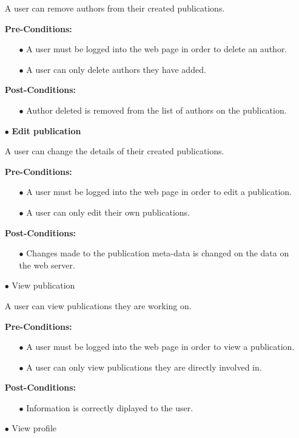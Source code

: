 \documentclass[a4paper,12pt]{article}
\begin{document}
\begin{itemize}
	 A user can remove authors from their created publications.

	\textbf{Pre-Conditions:}
	\begin{itemize}
		\item[$\bullet$]A user must be logged into the web page in order to delete an author.
		\item[$\bullet$]A user can only delete authors they have added.
		\\
	\end{itemize}
	\textbf{Post-Conditions: }
	\begin{itemize}
		\item[$\bullet$]Author deleted is removed from the list of authors on the publication.
		\\
	\end{itemize}
	\item[$\bullet$]\textbf{Edit publication}

	A user can change the details of their created publications.

	\textbf{Pre-Conditions:}
	\begin{itemize}
		\item[$\bullet$]A user must be logged into the web page in order to edit a publication.
		\item[$\bullet$]A user can only edit their own publications.
		\\
	\end{itemize}
	\textbf{Post-Conditions: }
	\begin{itemize}
		\item[$\bullet$]Changes made to the publication meta-data is changed on the data on the web server.
		\\
	\end{itemize}
	\item[$\bullet$]View publication

	A user can view publications they are working on.

	\textbf{Pre-Conditions:}
	\begin{itemize}
		\item[$\bullet$]A user must be logged into the web page in order to view a publication.
		\item[$\bullet$]A user can only view publications they are directly involved in.
		\\
	\end{itemize}
	\textbf{Post-Conditions: }
	\begin{itemize}
		\item[$\bullet$]Information is correctly diplayed to the user.
		\\
	\end{itemize}
	\item[$\bullet$]View profile


\end{itemize}
\end{document}

